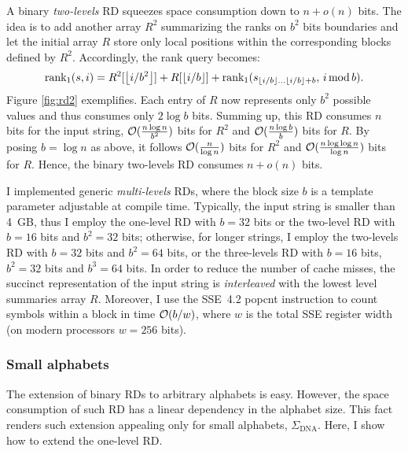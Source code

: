 A binary \emph{two-levels} RD squeezes space consumption down to $n+o(n)$ bits.
The idea is to add another array $R^2$ summarizing the ranks on $b^2$ bits boundaries and let the initial array $R$ store only local positions within the corresponding blocks defined by $R^2$.
Accordingly, the rank query becomes:
\begin{eqnarray}
\rank_1(s,i) = R^2[\xfloor{i/b^2}] + R[\xfloor{i/b}] + \rank_1(s_{\xfloor{i/b} \dots \xfloor{i/b}+b}, \, i \imod{b}).
\end{eqnarray}
Figure \ref{fig:rd2} exemplifies.
Each entry of $R$ now represents only $b^2$ possible values and thus consumes only $2\log{b}$ bits.
Summing up, this RD consumes $n$ bits for the input string, $\mathcal{O}(\frac{n \log{n}}{b^2})$ bits for $R^2$ and $\mathcal{O}(\frac{n \log{b}}{b})$ bits for $R$.
By posing $b=\log{n}$ as above, it follows $\mathcal{O}(\frac{n}{\log{n}})$ bits for $R^2$ and $\mathcal{O}(\frac{n \log{\log{n}}}{\log{n}})$ bits for $R$.
Hence, the binary two-levels RD consumes $n + o(n)$ bits.

I implemented generic \emph{multi-levels} RDs, where the block size $b$ is a template parameter adjustable at compile time.
Typically, the input string is smaller than 4~GB, thus I employ the one-level RD with $b = 32$ bits or the two-level RD with $b = 16$ bits and $b^2 = 32$ bits;
otherwise, for longer strings, I employ the two-levels RD with $b = 32$ bits and $b^2 = 64$ bits, or the three-levels RD with $b = 16$ bits, $b^2 = 32$ bits and $b^3 = 64$ bits.
In order to reduce the number of cache misses, the succinct representation of the input string is \emph{interleaved} with the lowest level summaries array $R$.
Moreover, I use the SSE~4.2 popcnt instruction \citep{Intel2011} to count symbols within a block in time $\mathcal{O}(b/w)$, where $w$ is the total SSE register width (on modern processors $w=256$ bits).

\subsubsection{Small alphabets}

The extension of binary RDs to arbitrary alphabets is easy.
However, the space consumption of such RD has a linear dependency in the alphabet size.
This fact renders such extension appealing only for small alphabets, \eg $\Sigma_{\text{DNA}}$.
Here, I show how to extend the one-level RD.

